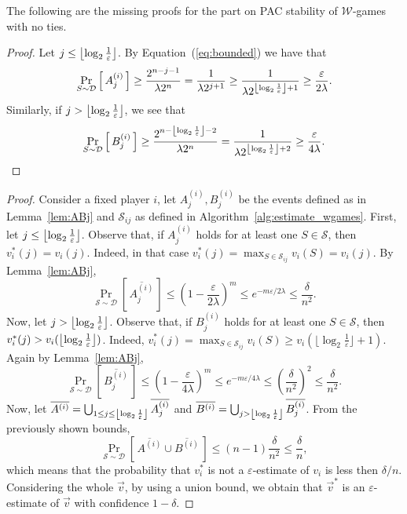 \documentclass[letterpaper]{article} %
\DeclarePairedDelimiter{\floor}{\lfloor}{\rfloor}
\let\epsilon\varepsilon
\let\eps\varepsilon
\newcommand{\distribution}{\mathcal{D}}
\newcommand{\Prob}[2]{\Pr_{#2}\left[\,#1\,\right]}
\newcommand{\Wthreshold}{\ensuremath{\floor*{\log_2{\frac{1}{\varepsilon}}}}}
\newcommand{\W}{\ensuremath{\mathcal{W}}}
\newcommand{\sample}{\ensuremath{\mathcal{S}}}
\begin{document}
The following are the missing proofs for the part on PAC stability of $\W$-games with no ties. 

\lemABj*
\begin{proof}
Let $j \leq \Wthreshold$. By Equation~(\ref{eq:bounded}) we have that
\[
\Prob{A^{(i)}_j}{S\sim \distribution} \geq \frac{2^{n-j-1}}{\lambda 2^n} = \frac{1}{\lambda 2^{j+1}} \geq \frac{1}{\lambda2^{\Wthreshold + 1}} \geq \frac{\eps}{2 \lambda}.
\]
Similarly, if $j > \Wthreshold$, we see that
\[
\Prob{B^{(i)}_j}{S\sim \distribution} \geq \frac{2^{n-\Wthreshold-2}}{\lambda 2^n} = \frac{1}{\lambda 2^{\Wthreshold+2}} \geq \frac{\eps}{4\lambda}.
\]
\end{proof}

\approxWgames*
\begin{proof}
Consider a fixed player $i$,
let $A^{(i)}_j, B^{(i)}_j$ be the events defined as in Lemma~\ref{lem:ABj} and $\sample_{ij}$ as defined in Algorithm~\ref{alg:estimate_wgames}.
First, let $j \leq \Wthreshold$.
Observe that, if $A^{(i)}_j$ holds for at least one $S \in \mathcal{S}$, then $v_i^*(j) = v_i(j)$. Indeed, in that case $v_i^*(j) = \max_{S \in \mathcal{S}_{ij}} v_i(S) = v_i(j)$. By Lemma~\ref{lem:ABj},
\begin{equation*}
    \Prob{\overline{A^{(i)}_j}}{\mathcal{S}\sim \distribution} \leq \left( 1-\frac{\eps}{2\lambda}\right)^m \leq e^{-m\eps/2\lambda} \leq \frac{\delta}{n^2}.
\end{equation*}
Now, let $j > \Wthreshold$.
Observe that, if $B^{(i)}_j$ holds for at least one $S \in \mathcal{S}$, then $v_i^*(j) > v_i(\Wthreshold)$. Indeed, $v_i^*(j) = \max_{S \in \mathcal{S}_{ij}} v_i(S) \geq v_i(\lfloor \log_2 \frac{1}{\epsilon}\rfloor + 1)$.
Again by Lemma~\ref{lem:ABj},
\begin{equation*}
    \Prob{\overline{B^{(i)}_j}}{\mathcal{S}\sim \distribution} \leq \left( 1-\frac{\eps}{4\lambda}\right)^m \leq e^{-m\eps/4\lambda} \leq \left(\frac{\delta}{n^2}\right)^2 \leq \frac{\delta}{n^2}.
\end{equation*}
Now, let $\overline{A^{(i)}} = \bigcup_{1\leq j\leq \Wthreshold}\overline{A^{(i)}_j}$ and $\overline{B^{(i)}}=\bigcup_{j> \Wthreshold}\overline{B^{(i)}_j}$.
From the previously shown bounds,
\begin{equation*}
    \Prob{\overline{A^{(i)}} \cup \overline{B^{(i)}}}{\mathcal{S}\sim \distribution} \leq (n-1)\frac{\delta}{n^2} \leq \frac{\delta}{n},
\end{equation*}
which means that the probability that $v_i^*$ is not a $\eps$-estimate of $v_i$ is less then $\delta/n$. Considering the whole $\vec{v}$, by using a union bound, we obtain that $\vec{v}^*$ is an $\eps$-estimate of $\vec{v}$ with confidence $1-\delta$.
\end{proof}
\end{document}
